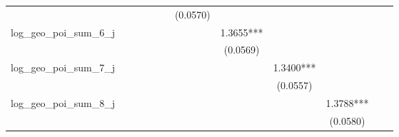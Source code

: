 \begin{table}
\begin{center}
\begin{tabular}{lccccccccccc}
                                &                       &                        &                         &                          &                           & (0.0570)                   &                             &                              &                               &                                &                                  \\
log\_geo\_poi\_sum\_6\_j        &                       &                        &                         &                          &                           &                            & 1.3655***                   &                              &                               &                                &                                  \\
                                &                       &                        &                         &                          &                           &                            & (0.0569)                    &                              &                               &                                &                                  \\
log\_geo\_poi\_sum\_7\_j        &                       &                        &                         &                          &                           &                            &                             & 1.3400***                    &                               &                                &                                  \\
                                &                       &                        &                         &                          &                           &                            &                             & (0.0557)                     &                               &                                &                                  \\
log\_geo\_poi\_sum\_8\_j        &                       &                        &                         &                          &                           &                            &                             &                              & 1.3788***                     &                                &                                  \\
                                &                       &                        &                         &                          &                           &                            &                             &                              & (0.0580)                      &                                &                                  \\

\end{tabular}
\end{center}
\end{table}
